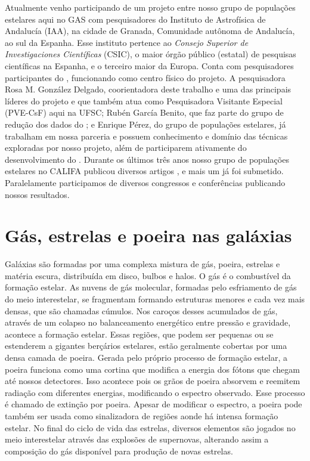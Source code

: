 Atualmente venho participando de um projeto entre nosso grupo de populações estelares aqui no GAS
com pesquisadores do Instituto de Astrofísica de Andalucía (IAA), na cidade de Granada, Comunidade
autônoma de Andalucía, ao sul da Espanha. Esse instituto pertence ao {\em Consejo Superior de
Investigaciones Científicas} (CSIC), o maior órgão público (estatal) de pesquisas científicas na
Espanha, e o terceiro maior da Europa. Conta com pesquisadores participantes do \PCAL, funcionando
como centro físico do projeto. A pesquisadora Rosa M. González Delgado, coorientadora deste
trabalho e uma das principais líderes do projeto e que também atua como Pesquisadora Visitante
Especial (PVE-CsF) aqui na UFSC; Rubén García Benito, que faz parte do grupo de redução dos dados do
\CALS; e Enrique Pérez, do grupo de populações estelares, já trabalham em nossa parceria e possuem
conhecimento e domínio das técnicas exploradas por nosso projeto, além de participarem ativamente do
desenvolvimento do \PCAL. Durante os últimos três anos nosso grupo de populações estelares no CALIFA
publicou diversos artigos \citep[e.g., ][]{Perez.etal.2013a, GonzalezDelgado.etal.2014a,
GonzalezDelgado.etal.2014b, GonzalezDelgado.etal.2015a}, e mais um já foi submetido. Paralelamente
participamos de diversos congressos e conferências publicando nossos resultados.


\section{Gás, estrelas e poeira nas galáxias}
\label{sec:intro:galaxias}

Galáxias são formadas por uma complexa mistura de gás, poeira, estrelas e matéria escura,
distribuída em disco, bulbos e halos. O gás é o combustível da formação estelar. As nuvens de gás
molecular, formadas pelo esfriamento de gás do meio interestelar, se fragmentam formando estruturas
menores e cada vez mais densas, que são chamadas cúmulos. Nos caroços desses acumulados de gás,
através de um colapso no balanceamento energético entre pressão e gravidade, acontece a formação
estelar. Essas regiões, que podem ser pequenas ou se estenderem a gigantes berçários estelares,
estão geralmente cobertas por uma densa camada de poeira. Gerada pelo próprio processo de formação
estelar, a poeira funciona como uma cortina que modifica a energia dos fótons que chegam até nossos
detectores. Isso acontece pois os grãos de poeira absorvem e reemitem radiação com diferentes
energias, modificando o espectro observado. Esse processo é chamado de extinção por poeira. Apesar
de modificar o espectro, a poeira pode também ser usada como sinalizadora de regiões aonde há
intensa formação estelar. No final do ciclo de vida das estrelas, diversos elementos são jogados no
meio interestelar através das explosões de supernovas, alterando assim a composição do gás
disponível para produção de novas estrelas. 

